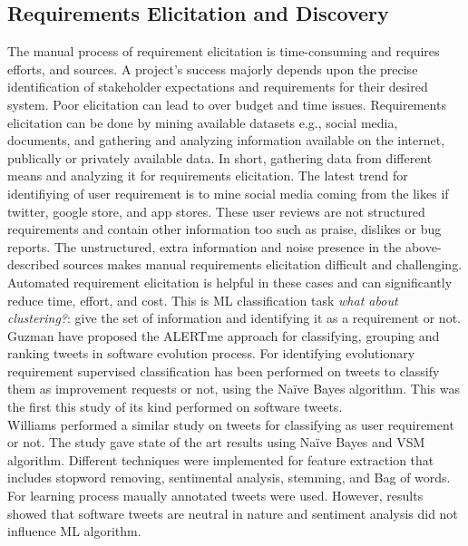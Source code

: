 
\subsection{Requirements Elicitation and Discovery}

The manual process of requirement elicitation is time-consuming and requires
efforts, and sources. A project's success majorly depends
upon the precise identification of stakeholder expectations and requirements for their desired
system. Poor elicitation can lead to over budget and time issues.
 Requirements elicitation can be done by mining
available datasets e.g., social media, documents, and gathering and analyzing information available on the internet,
publically or privately available data. In short, gathering data from different
means and analyzing it for requirements elicitation.  The latest trend for
identifiying of user requirement is to mine social media coming from the likes
if twitter, google store, and app stores. These user reviews are not
structured requirements and contain other information too such as praise,
dislikes or bug reports. The unstructured, extra information and noise
presence in the above-described sources makes manual requirements
elicitation difficult and challenging. Automated requirement elicitation
is helpful in these cases and can significantly reduce time, effort, and cost.
This is ML classification task \emph{what about clustering?}: give the set of
information and identifying it as a requirement or not.
\\

Guzman \etal \cite{Guzman:2017} have proposed the ALERTme approach for
classifying, grouping and ranking tweets in software evolution
process. For identifying evolutionary requirement supervised classification
has been performed on tweets to classify them as improvement requests or not,
using the Naïve Bayes algorithm. This was the first this study of its kind
performed on software tweets.\\

Williams \etal \cite{Williams:2017} performed a similar study on tweets for
classifying as user requirement or not. The study gave state of the art results
using Naïve Bayes and VSM algorithm. Different techniques were implemented for
feature extraction that includes stopword removing, sentimental analysis,
stemming, and Bag of words.
For learning process maually annotated tweets were used. However, results showed
that software tweets are neutral in nature and sentiment analysis did not
influence ML algorithm.\\

